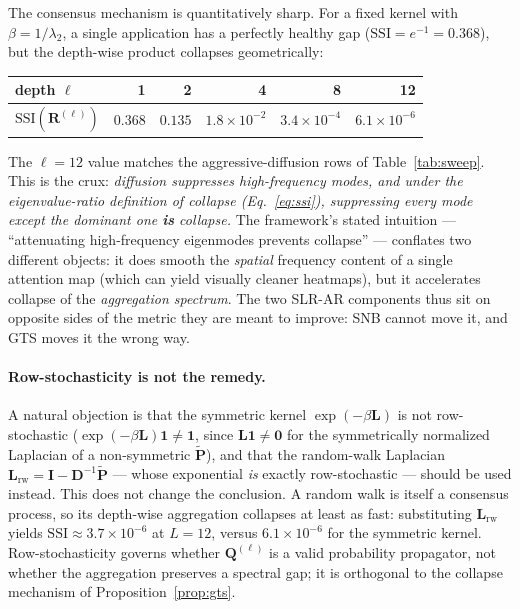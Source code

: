 \documentclass[11pt]{article}
\newcommand{\D}{\mathbf{D}}
\newcommand{\I}{\mathbf{I}}
\newcommand{\Lap}{\mathbf{L}}
\newcommand{\Pt}{\tilde{\mathbf{P}}}
\newcommand{\Q}{\mathbf{Q}}
\newcommand{\R}{\mathbf{R}}
\newcommand{\SSI}{\mathrm{SSI}}
\begin{document}
The consensus mechanism is quantitatively sharp. For a fixed kernel with
$\beta=1/\lambda_2$, a single application has a perfectly healthy gap
($\SSI=e^{-1}=0.368$), but the depth-wise product collapses geometrically:
\begin{center}
\begin{tabular}{l r r r r r}
\toprule
depth $\ell$ & 1 & 2 & 4 & 8 & 12 \\
\midrule
$\SSI(\R^{(\ell)})$ & $0.368$ & $0.135$ & $1.8\times10^{-2}$
& $3.4\times10^{-4}$ & $6.1\times10^{-6}$ \\
\bottomrule
\end{tabular}
\end{center}
The $\ell=12$ value matches the aggressive-diffusion rows of
Table~\ref{tab:sweep}. This is the crux: \emph{diffusion suppresses
high-frequency modes, and under the eigenvalue-ratio definition of collapse
(Eq.~\ref{eq:ssi}), suppressing every mode except the dominant one \textbf{is}
collapse.} The framework's stated intuition --- ``attenuating high-frequency
eigenmodes prevents collapse'' --- conflates two different objects: it does
smooth the \emph{spatial} frequency content of a single attention map (which can
yield visually cleaner heatmaps), but it accelerates collapse of the
\emph{aggregation spectrum}. The two SLR-AR components thus sit on opposite
sides of the metric they are meant to improve: SNB cannot move it, and GTS moves
it the wrong way.

\paragraph{Row-stochasticity is not the remedy.} A natural objection is that the
symmetric kernel $\exp(-\beta\Lap)$ is not row-stochastic
($\exp(-\beta\Lap)\mathbf{1}\neq\mathbf{1}$, since $\Lap\mathbf{1}\neq\mathbf{0}$
for the symmetrically normalized Laplacian of a non-symmetric $\Pt$), and that
the random-walk Laplacian $\Lap_{\mathrm{rw}}=\I-\D^{-1}\Pt$ --- whose
exponential \emph{is} exactly row-stochastic --- should be used instead. This
does not change the conclusion. A random walk is itself a consensus process, so
its depth-wise aggregation collapses at least as fast: substituting
$\Lap_{\mathrm{rw}}$ yields $\SSI\approx3.7\times10^{-6}$ at $L=12$, versus
$6.1\times10^{-6}$ for the symmetric kernel. Row-stochasticity governs whether
$\Q^{(\ell)}$ is a valid probability propagator, not whether the aggregation
preserves a spectral gap; it is orthogonal to the collapse mechanism of
Proposition~\ref{prop:gts}.
\end{document}
